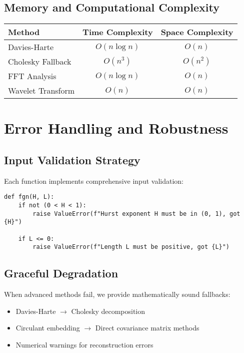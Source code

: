 \documentclass[11pt,a4paper]{article}
\begin{document}
\subsection{Memory and Computational Complexity}

\begin{center}
\begin{tabular}{|l|c|c|}
\hline
\textbf{Method} & \textbf{Time Complexity} & \textbf{Space Complexity} \\
\hline
Davies-Harte & $O(n \log n)$ & $O(n)$ \\
Cholesky Fallback & $O(n^3)$ & $O(n^2)$ \\
FFT Analysis & $O(n \log n)$ & $O(n)$ \\
Wavelet Transform & $O(n)$ & $O(n)$ \\
\hline
\end{tabular}
\end{center}

\section{Error Handling and Robustness}

\subsection{Input Validation Strategy}

Each function implements comprehensive input validation:

\begin{lstlisting}
def fgn(H, L):
    if not (0 < H < 1):
        raise ValueError(f"Hurst exponent H must be in (0, 1), got {H}")
    
    if L <= 0:
        raise ValueError(f"Length L must be positive, got {L}")
\end{lstlisting}

\subsection{Graceful Degradation}

When advanced methods fail, we provide mathematically sound fallbacks:

\begin{itemize}
    \item Davies-Harte $\rightarrow$ Cholesky decomposition
    \item Circulant embedding $\rightarrow$ Direct covariance matrix methods
    \item Numerical warnings for reconstruction errors
\end{itemize}
\end{document}
